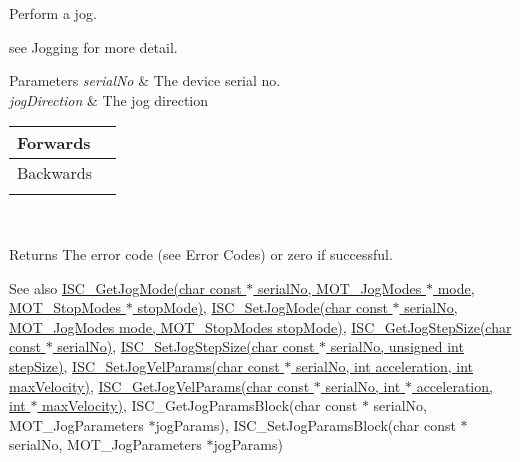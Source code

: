 Perform a jog. 

see Jogging for more detail.


\begin{DoxyParams}{Parameters}
{\em serial\+No} & The device serial no. \\
\hline
{\em jog\+Direction} & The jog direction \begin{tabularx}{\linewidth}{|*{2}{>{\raggedright\arraybackslash}X|}}\hline
Forwards&1 \\\cline{1-2}
Backwards&2 \\\cline{1-2}
\end{tabularx}
\\
\hline
\end{DoxyParams}
\begin{DoxyReturn}{Returns}
The error code (see Error Codes) or zero if successful. 
\end{DoxyReturn}
\begin{DoxySeeAlso}{See also}
\hyperlink{group___integrated_stepper_motors_gaab2198da230c8a2c532c644958fd673b}{I\+S\+C\+\_\+\+Get\+Jog\+Mode(char const $\ast$ serial\+No, M\+O\+T\+\_\+\+Jog\+Modes $\ast$ mode, M\+O\+T\+\_\+\+Stop\+Modes $\ast$ stop\+Mode)}, \hyperlink{group___integrated_stepper_motors_ga13d248af45e7b14fd4dde2c2d403e262}{I\+S\+C\+\_\+\+Set\+Jog\+Mode(char const $\ast$ serial\+No, M\+O\+T\+\_\+\+Jog\+Modes mode, M\+O\+T\+\_\+\+Stop\+Modes stop\+Mode)}, \hyperlink{group___integrated_stepper_motors_gaaced0eae4d9e787711102fb2d388c4ac}{I\+S\+C\+\_\+\+Get\+Jog\+Step\+Size(char const $\ast$ serial\+No)}, \hyperlink{group___integrated_stepper_motors_ga3a5ad9b0ffc60c9f7e821b11c7a844b5}{I\+S\+C\+\_\+\+Set\+Jog\+Step\+Size(char const $\ast$ serial\+No, unsigned int step\+Size)}, \hyperlink{group___integrated_stepper_motors_ga43510de1088ba16f4a718cd66ee9368d}{I\+S\+C\+\_\+\+Set\+Jog\+Vel\+Params(char const $\ast$ serial\+No, int acceleration, int max\+Velocity)}, \hyperlink{group___integrated_stepper_motors_ga375530d0ec2239a526f22574da6b6968}{I\+S\+C\+\_\+\+Get\+Jog\+Vel\+Params(char const $\ast$ serial\+No, int $\ast$ acceleration, int $\ast$ max\+Velocity)}, I\+S\+C\+\_\+\+Get\+Jog\+Params\+Block(char const $\ast$ serial\+No, M\+O\+T\+\_\+\+Jog\+Parameters $\ast$jog\+Params), I\+S\+C\+\_\+\+Set\+Jog\+Params\+Block(char const $\ast$ serial\+No, M\+O\+T\+\_\+\+Jog\+Parameters $\ast$jog\+Params)


\end{DoxySeeAlso}

\begin{DoxyCodeInclude}
\end{DoxyCodeInclude}

